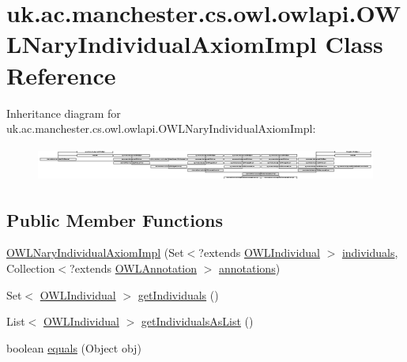 \hypertarget{classuk_1_1ac_1_1manchester_1_1cs_1_1owl_1_1owlapi_1_1_o_w_l_nary_individual_axiom_impl}{\section{uk.\-ac.\-manchester.\-cs.\-owl.\-owlapi.\-O\-W\-L\-Nary\-Individual\-Axiom\-Impl Class Reference}
\label{classuk_1_1ac_1_1manchester_1_1cs_1_1owl_1_1owlapi_1_1_o_w_l_nary_individual_axiom_impl}
}
Inheritance diagram for uk.\-ac.\-manchester.\-cs.\-owl.\-owlapi.\-O\-W\-L\-Nary\-Individual\-Axiom\-Impl\-:\begin{figure}[H]
\begin{center}
\leavevmode
\includegraphics[height=1.133890cm]{classuk_1_1ac_1_1manchester_1_1cs_1_1owl_1_1owlapi_1_1_o_w_l_nary_individual_axiom_impl}
\end{center}
\end{figure}
\subsection*{Public Member Functions}
\begin{DoxyCompactItemize}
\item 
\hyperlink{classuk_1_1ac_1_1manchester_1_1cs_1_1owl_1_1owlapi_1_1_o_w_l_nary_individual_axiom_impl_a3edd6531e6de1c7c9e740b3cd8920190}{O\-W\-L\-Nary\-Individual\-Axiom\-Impl} (Set$<$?extends \hyperlink{interfaceorg_1_1semanticweb_1_1owlapi_1_1model_1_1_o_w_l_individual}{O\-W\-L\-Individual} $>$ \hyperlink{classuk_1_1ac_1_1manchester_1_1cs_1_1owl_1_1owlapi_1_1_o_w_l_nary_individual_axiom_impl_aa2ee45265a7a0c1f5cc9260ac97ac071}{individuals}, Collection$<$?extends \hyperlink{interfaceorg_1_1semanticweb_1_1owlapi_1_1model_1_1_o_w_l_annotation}{O\-W\-L\-Annotation} $>$ \hyperlink{classuk_1_1ac_1_1manchester_1_1cs_1_1owl_1_1owlapi_1_1_o_w_l_axiom_impl_af6fbf6188f7bdcdc6bef5766feed695e}{annotations})
\item 
Set$<$ \hyperlink{interfaceorg_1_1semanticweb_1_1owlapi_1_1model_1_1_o_w_l_individual}{O\-W\-L\-Individual} $>$ \hyperlink{classuk_1_1ac_1_1manchester_1_1cs_1_1owl_1_1owlapi_1_1_o_w_l_nary_individual_axiom_impl_af3067e07f979fa7a26da4da37fa73f81}{get\-Individuals} ()
\item 
List$<$ \hyperlink{interfaceorg_1_1semanticweb_1_1owlapi_1_1model_1_1_o_w_l_individual}{O\-W\-L\-Individual} $>$ \hyperlink{classuk_1_1ac_1_1manchester_1_1cs_1_1owl_1_1owlapi_1_1_o_w_l_nary_individual_axiom_impl_aed19ea141facf5129b3c445612edcd22}{get\-Individuals\-As\-List} ()
\item 
boolean \hyperlink{classuk_1_1ac_1_1manchester_1_1cs_1_1owl_1_1owlapi_1_1_o_w_l_nary_individual_axiom_impl_a3c0024980bec29ae804830ca05191cc0}{equals} (Object obj)
\end{DoxyCompactItemize}
